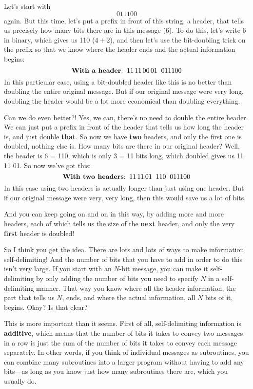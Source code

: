 \documentclass[12pt]{book}
\begin{document}
Let's start with
\[
   011100
\]
again.  But this time, let's put a prefix in front of this string, a header, that tells
us precisely how many bits there are in this message (6).  To do this, let's write 6 in
binary, which gives us 110 ($4+2$), and then let's use the bit-doubling trick on the prefix
so that we know where the header ends and the actual information begins:
\[
   \mbox{\textbf{With a header}:} \;\; 11\, 11\, 00\, 01 \;\; 011100 
\]
In this particular case,
using a bit-doubled header like this 
is no better than doubling the entire original message.
But if our original message were very long, doubling the header would be a lot more economical
than doubling everything.
 
Can we do even better?! Yes, we can, there's no need to double the entire header.
We can just put a prefix in front of the header that tells us how long the header is,
and just double \textbf{that}. So now we have \textbf{two} headers, 
and only the first one is doubled, nothing else is.
How many bits are there in our original header? Well, the header is  6 = 110, 
which is only 3 = 11 bits long,
which doubled gives us 11 11 01.  So now we've got this:
\[
   \mbox{\textbf{With two headers}:} \;\; 11\, 11\, 01 \;\; 110 \;\; 011100
\]
In this case using two headers is
actually longer than just using one header.  But if our original message were very, very long,
then this would save us a lot of bits.
 
And you can keep going on and on in this way, 
by adding more and more headers, each of which tells us the size
of the \textbf{next} header, and only the very \textbf{first} header is doubled!
 
So I think you get the idea.  There are lots and lots of ways to make information self-delimiting!
And the number of bits that you have to add in order to do this isn't very large. 
If you start with an $N$-bit message, you can make it self-delimiting by only adding the number
of bits you need to specify $N$ in a self-delimiting manner. That way you know where all the header
information, the part that tells us $N$, ends, and where the actual information, all $N$ bits of it,
begins. Okay? Is that clear?  
 
This is more important than it seems.  First of all, self-delimiting information is \textbf{additive},
which means that the number of bits it takes to convey two messages in a row is just the sum of
the number of bits it takes to convey each message separately.  In other words, if you think of
individual messages as subroutines, you can combine many subroutines into a larger program without having
to add any bits---as long as you know just how many subroutines there are, which you usually do.
 
\end{document}
